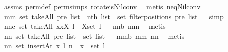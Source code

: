 \begin{isabellebody}
%
\isadelimproof
%
\endisadelimproof
%
\isatagproof
{}\isamarkupfalse%
\ assms\ perm{}{\isacharunderscore}def\ perm{}{\isachardot}simps{\isacharparenleft}{}{\isacharparenright}\ rotate{\isacharunderscore}is{\isacharunderscore}Nil{\isacharunderscore}conv\ \isamarkupfalse%
\ {\isacharparenleft}metis\ neq{\isacharunderscore}Nil{\isacharunderscore}conv{\isacharparenright}%
\endisatagproof
{\isafoldproof}%
%
\isadelimproof
\isanewline
%
\endisadelimproof
{}\isamarkupfalse%
\ mm{}{}{\isacharcolon}\ {\isachardoublequoteopen}set\ {\isacharparenleft}takeAll\ pre\ list{\isacharparenright}\ {\isacharequal}\ {\isacharparenleft}{\isacharparenleft}nth\ list{\isacharparenright}\ {\isacharbackquote}\ set\ {\isacharparenleft}filterpositions{}\ pre\ list{\isacharparenright}{\isacharparenright}{\isachardoublequoteclose}%
\isadelimproof
\ %
\endisadelimproof
%
\isatagproof
{}\isamarkupfalse%
\ simp%
\endisatagproof
{\isafoldproof}%
%
\isadelimproof
%
\endisadelimproof
\isanewline
\isanewline
{}\isamarkupfalse%
\ nn{}{}c{\isacharcolon}\ {\isachardoublequoteopen}set\ {\isacharparenleft}takeAll\ {\isacharparenleft}{\isacharpercent}x{\isachardot}{\isacharparenleft}x{\isasymin}X{\isacharparenright}{\isacharparenright}\ l{\isacharparenright}\ {\isasymsubseteq}\ X{\isasyminter}set\ l{\isachardoublequoteclose}%
\isadelimproof
\ %
\endisadelimproof
%
\isatagproof
{}\isamarkupfalse%
\ nn{}{}b\ mm{}{}\ \isamarkupfalse%
\ metis%
\endisatagproof
{\isafoldproof}%
%
\isadelimproof
%
\endisadelimproof
\isanewline
\isanewline
{}\isamarkupfalse%
\ nn{}{}{\isacharcolon}\ {\isachardoublequoteopen}set\ {\isacharparenleft}takeAll\ pre\ list{\isacharparenright}\ {\isasymsubseteq}\ set\ list{\isachardoublequoteclose}%
\isadelimproof
\ %
\endisadelimproof
%
\isatagproof
{}\isamarkupfalse%
\ mm{}{}b\ mm{}{}\ nn{}{}\ \isamarkupfalse%
\ metis%
\endisatagproof
{\isafoldproof}%
%
\isadelimproof
%
\endisadelimproof
\isanewline
{}\isamarkupfalse%
\ nn{}{}{\isacharcolon}\ {\isachardoublequoteopen}set\ {\isacharparenleft}insertAt\ x\ l\ n{\isacharparenright}\ {\isacharequal}\ {\isacharbraceleft}x{\isacharbraceright}\ {\isasymunion}\ set\ l{\isachardoublequoteclose}%
\isadelimproof

\end{isabellebody}
